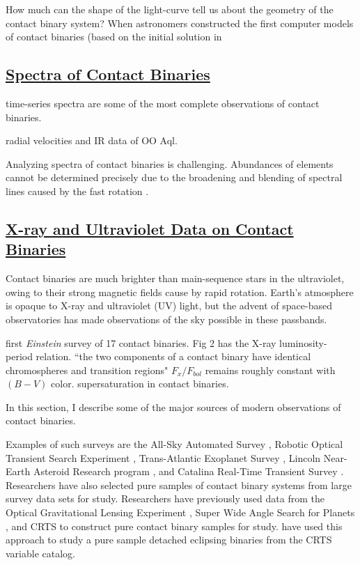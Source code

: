 \documentclass[12pt]{article} %
\numberwithin{equation}{section} %
\begin{document}
How much can the shape of the light-curve tell us about the geometry of the contact binary system? When astronomers constructed the first computer models of contact binaries (based on the initial solution in \cite{lucy1968light}

\subsection[Spectra of Contact Binaries]{\hyperlink{toc}{Spectra of Contact Binaries}} \label{sec: Spectra of Contact Binaries}

time-series spectra are some of the most complete observations of contact binaries. 

\citep{hrivnak1989radial} radial velocities and IR data of OO Aql.

Analyzing spectra of contact binaries is challenging. Abundances of elements cannot be determined precisely due to the broadening and blending of spectral lines caused by the fast rotation \citep{gazeas2006masses}. 

\subsection[X-ray and Ultraviolet Data on Contact Binaries]{\hyperlink{toc}{X-ray and Ultraviolet Data on Contact Binaries}} \label{sec: X-ray and Ultraviolet Data on Contact Binaries}

Contact binaries are much brighter than main-sequence stars in the ultraviolet, owing to their strong magnetic fields cause by rapid rotation. Earth's atmosphere is opaque to X-ray and ultraviolet (UV) light, but the advent of space-based observatories has made observations of the sky possible in these passbands.

\citep{cruddace1984contact} first \emph{Einstein} survey of 17 contact binaries. Fig 2 has the X-ray luminosity- period relation.
\citep{vilhu1987chromospheric} ``the two components of a contact binary have identical chromospheres and transition regions" $F_{x} / F_{bol}$ remains roughly constant with $(B - V)$ color.
\citep{stepien2001rosat} supersaturation in contact binaries.


In this section, I describe some of the major sources of modern observations of contact binaries. 

Examples of such surveys are the All-Sky Automated Survey \citep[ASAS,][]{pojmanski2000all}, Robotic Optical Transient Search Experiment \citep[ROTSE,][]{akerlof2000rotse}, Trans-Atlantic Exoplanet Survey \citep[TrES,][]{devor2008identification}, Lincoln Near-Earth Asteroid Research program \citep[LINEAR,][]{palaversa2013exploring}, and Catalina Real-Time Transient Survey \citep[CRTS,][]{drake2014catalina}. Researchers have also selected pure samples of contact binary systems from large survey data sets for study. Researchers have previously used data from the Optical Gravitational Lensing Experiment \citep[OGLE,][]{rucinski1996eclipsing}, Super Wide Angle Search for Planets \citep[SuperWASP,][]{norton2011short}, and CRTS \citep{drake2014ultra} to construct pure contact binary samples for study. \citet{lee2015properties} have used this approach to study a pure sample detached eclipsing binaries from the CRTS variable catalog. 
\end{document}
